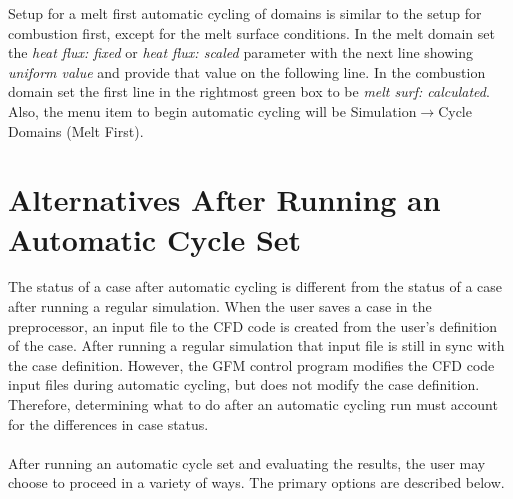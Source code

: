 \documentclass[12pt]{article}
\newcommand{\smenu}[2]{\textsf{#1$\to$#2}}
\newcommand{\parm}[1]{\textit{#1}}
\numberwithin{equation}{section}
\begin{document}
\noindent
Setup for a melt first automatic cycling of domains is similar to the setup for combustion first, except for the melt surface conditions. In the melt domain set the \parm{heat flux: fixed} or \parm{heat flux: scaled} parameter with the next line showing \parm{uniform value} and provide that value on the following line. In the combustion domain set the first line in the rightmost green box to be \parm{melt surf: calculated}. Also, the menu item to begin automatic cycling will be \smenu{Simulation}{Cycle Domains (Melt First)}.

\section{Alternatives After Running an Automatic Cycle Set}
\label{sec:altern}
\noindent
The status of a case after automatic cycling is different from the status of a case after running a regular simulation. When the user saves a case in the preprocessor, an input file to the CFD code is created from the user's definition of the case. After running a regular simulation that input file is still in sync with the case definition. However, the GFM control program modifies the CFD code input files during automatic cycling, but does not modify the case definition. Therefore, determining what to do after an automatic cycling run must account for the differences in case status.\\
\\
After running an automatic cycle set and evaluating the results, the user may choose to proceed in a variety of ways. The primary options are described below.
\end{document}
